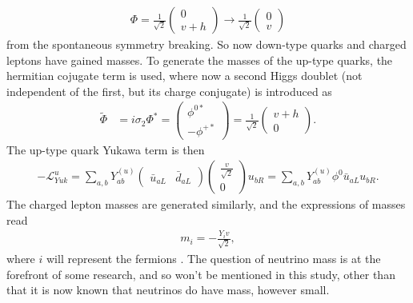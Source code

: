 \documentclass[a4paper,12pt]{article}
\begin{document}
\begin{align}
    \label{eq:vtoh}
    \Phi = \frac{1}{\sqrt{2}}\begin{pmatrix}0\\v+h\end{pmatrix}\to\frac{1}{\sqrt{2}}\begin{pmatrix}0\\v\end{pmatrix}
\end{align}
from the spontaneous symmetry breaking. 
So now down-type quarks and charged leptons have gained masses. 
To generate the masses of the up-type quarks, the hermitian cojugate term is used, where now a second Higgs doublet (not independent of the first, but its charge conjugate) is introduced as
\begin{align}
    \label{eq:highc}
    \tilde{\Phi} &= i\sigma_2\Phi^* = \begin{pmatrix}\phi^{0*}\\-\phi^{+*}\end{pmatrix} = \frac{1}{\sqrt{2}}\begin{pmatrix}v+h\\0\end{pmatrix}.
\end{align}
The up-type quark Yukawa term is then
\begin{align}
    \label{eq:yukhc}
    -\mathcal{L}_{Yuk}^u = \sum_{a,b} Y^{(u)}_{ab}\begin{pmatrix}\bar{u}_{aL} & \bar{d}_{aL}\end{pmatrix}\begin{pmatrix}\frac{v}{\sqrt{2}}\\0\end{pmatrix}u_{bR} = \sum_{a,b}Y^{(u)}_{ab}\phi^0\bar{u}_{aL}u_{bR}.
\end{align}
The charged lepton masses are generated similarly, and the expressions of masses read
\begin{align}
    \label{eq:fermas}
    m_i = -\frac{Y_iv}{\sqrt{2}},
\end{align}
where $i$ will represent the fermions \cite{o}. 
The question of neutrino mass is at the forefront of some research, and so won't be mentioned in this study, other than that it is now known that neutrinos do have mass, however small. 
\end{document}
